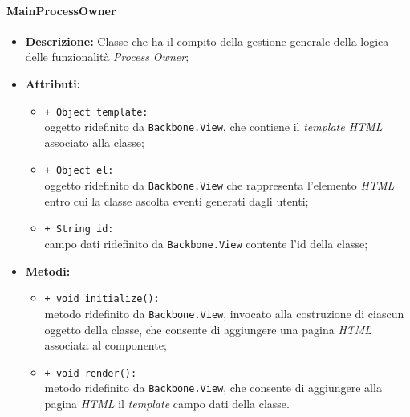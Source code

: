 \paragraph{MainProcessOwner}
\begin{flushleft}
\begin{itemize}
\item \textbf{Descrizione:} Classe che ha il compito della gestione generale della logica delle funzionalità \textit{Process Owner};
\item \textbf{Attributi:}
\begin{sloppypar}
\begin{itemize}
\item \texttt{+ Object template:}\\ oggetto ridefinito da \texttt{Backbone.View}, che contiene il \textit{template HTML} associato alla classe;
\item \texttt{+ Object el:}\\ oggetto ridefinito da \texttt{Backbone.View} che rappresenta l'elemento \textit{HTML} entro cui la classe ascolta eventi generati dagli utenti;
\item \texttt{+ String id:}\\ campo dati ridefinito da \texttt{Backbone.View} contente l'id della classe;
\end{itemize}
\end{sloppypar}
\item \textbf{Metodi:}
\begin{sloppypar}
\begin{itemize}
\item \texttt{+ void initialize():}\\ metodo ridefinito da \texttt{Backbone.View}, invocato alla costruzione di ciascun oggetto della classe, che consente di aggiungere una pagina \textit{HTML} associata al componente;
\item \texttt{+ void render():}\\ metodo ridefinito da \texttt{Backbone.View}, che consente di aggiungere alla pagina \textit{HTML} il \textit{template} campo dati della classe.
\end{itemize}
\end{sloppypar}
\end{itemize}
\end{flushleft}

